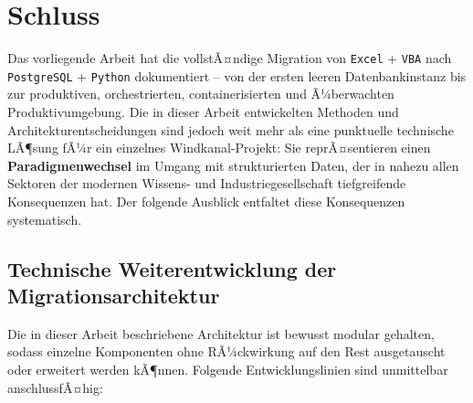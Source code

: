 ﻿\documentclass[12pt,a4paper]{report}
\theoremstyle{definition}
\theoremstyle{remark}
\newcommand{\excel}{\texttt{Excel}}
\newcommand{\vba}{\texttt{VBA}}
\newcommand{\pg}{\texttt{PostgreSQL}}
\newcommand{\py}{\texttt{Python}}
\begin{document}
\chapter{Schluss}
\label{sec:final}

Das vorliegende Arbeit hat die vollstÃ¤ndige Migration von \excel{} + \vba{}
nach \pg{} + \py{} dokumentiert -- von der ersten leeren Datenbankinstanz
bis zur produktiven, orchestrierten, containerisierten und Ã¼berwachten
Produktivumgebung. Die in dieser Arbeit entwickelten Methoden und
Architekturentscheidungen sind jedoch weit mehr als eine punktuelle
technische LÃ¶sung fÃ¼r ein einzelnes Windkanal-Projekt: Sie
reprÃ¤sentieren einen \textbf{Paradigmenwechsel} im Umgang mit
strukturierten Daten, der in nahezu allen Sektoren der modernen
Wissens- und Industriegesellschaft tiefgreifende Konsequenzen hat.
Der folgende Ausblick entfaltet diese Konsequenzen systematisch.

\section{Technische Weiterentwicklung der Migrationsarchitektur}

Die in dieser Arbeit beschriebene Architektur ist bewusst modular
gehalten, sodass einzelne Komponenten ohne RÃ¼ckwirkung auf den Rest
ausgetauscht oder erweitert werden kÃ¶nnen.
Folgende Entwicklungslinien sind unmittelbar anschlussfÃ¤hig:
\end{document}
